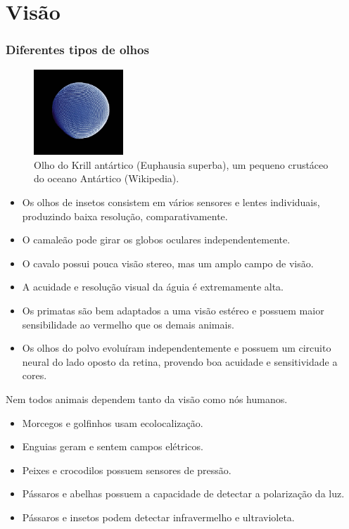 \section{Visão}
\begin{frame}[allowframebreaks]
  \frametitle{Diferentes tipos de olhos}

  \begin{figure}[h]
  \centering
  \includegraphics[width=0.3\textwidth]{images/krilleyekils.jpg}
  \caption{Olho do Krill antártico (Euphausia superba), um pequeno crustáceo do oceano Antártico (Wikipedia).}\label{fig-krilleyekils}
  \end{figure}

  \framebreak

  \begin{itemize}
  \item Os olhos de insetos consistem em vários sensores e lentes individuais, produzindo baixa resolução, comparativamente.
  \item O camaleão pode girar os globos oculares independentemente.
  \item O cavalo possui pouca visão stereo, mas um amplo campo de visão.
  \item A acuidade e resolução visual da águia é extremamente alta.
  \item Os primatas são bem adaptados a uma visão estéreo e possuem maior sensibilidade ao vermelho que os demais animais.
  \item Os olhos do polvo evoluíram independentemente e possuem um circuito neural do lado oposto da retina, provendo boa acuidade e sensitividade a cores.
  \end{itemize}

  \framebreak 

  Nem todos animais dependem tanto da visão como nós humanos.
  \begin{itemize}
  \item Morcegos e golfinhos usam ecolocalização.
  \item Enguias geram e sentem campos elétricos.
  \item Peixes e crocodilos possuem sensores de pressão.
  \item Pássaros e abelhas possuem a capacidade de detectar a polarização da luz.
  \item Pássaros e insetos podem detectar infravermelho e ultravioleta.
  \end{itemize}

\end{frame}


